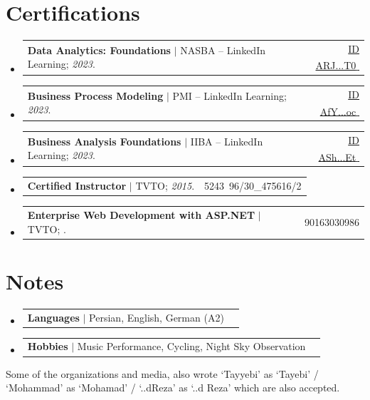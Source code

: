 \documentclass[11pt,a4paper]{article}
\makeatletter
\let\orighref\href
\renewcommand{\href}[2]{\orighref{#1}{#2\,{\textsuperscript{\tiny{\textcolor{heritagered}{\faExternalLink}}}}}}
\newcommand{\deemph}[1]{{\color{gray}#1}}
\newcommand{\resumeProjectHeading}[2]{
    \item
    \begin{tabular*}{0.97\textwidth}{l@{\extracolsep{\fill}}r}
      \small#1 & \deemph{#2} \\
    \end{tabular*}\vspace{-7pt}
}
\newcommand{\resumeSubHeadingListStart}{\begin{itemize}[leftmargin=0.15in, label={}]}
\newcommand{\resumeSubHeadingListEnd}{\end{itemize}}
\makeatother
\begin{document}
    


\section{Certifications}
    \resumeSubHeadingListStart
      \resumeProjectHeading
          {\textbf{Data Analytics: Foundations} $|$ NASBA -- LinkedIn Learning; \emph{2023}.}{\href{https://www.linkedin.com/learning/certificates/10c24841aac6b0c139f4971a8efd6d10356dc105124e31fa10eb32aa14ce3392}{\deemph{ID} \small{ARJ...T0}}}
      \resumeProjectHeading
          {\textbf{Business Process Modeling} $|$ PMI -- LinkedIn Learning; \emph{2023}.}{\href{https://www.linkedin.com/learning/certificates/3d1e244d9234631a908175486d19855434634d7f61cec316326ba4eb269bb041}{\deemph{ID} \small{AfY...oc}}}
      \resumeProjectHeading
          {\textbf{Business Analysis Foundations} $|$ IIBA -- LinkedIn Learning; \emph{2023}.}{\href{https://www.linkedin.com/learning/certificates/51dd265ef63b58255245c8f7438549551c92d30031e81b9ad864ee6994e1f6e6}{\deemph{ID} \small{ASh...Et}}}
       \resumeProjectHeading
           {\textbf{Certified Instructor} $|$ TVTO; \emph{2015}.}{\deemph{Contract No.} 5243\, 96/30\_475616/2}
     \resumeProjectHeading
           {\textbf{Enterprise Web Development with ASP.NET} $|$ TVTO; \emph{\highlight{2013}}.}{\deemph{No.} 90163030986}

    \resumeSubHeadingListEnd

\section{Notes}
    \resumeSubHeadingListStart

      \resumeProjectHeading{\textbf{Languages} $|$ Persian, English, German (A2)}{}
      \resumeProjectHeading{\textbf{Hobbies} $|$ Music Performance, Cycling, Night Sky Observation}{}
      
    \resumeSubHeadingListEnd        


\mbox{}
\vfill
\leavevmode
\tiny
\deemph{Some of the organizations and media, also wrote ‘Tayyebi’ as ‘Tayebi’ / ‘Mohammad’ as ‘Mohamad’ / ‘..dReza’ as ‘..d Reza’ which are also accepted.}
\end{document}
